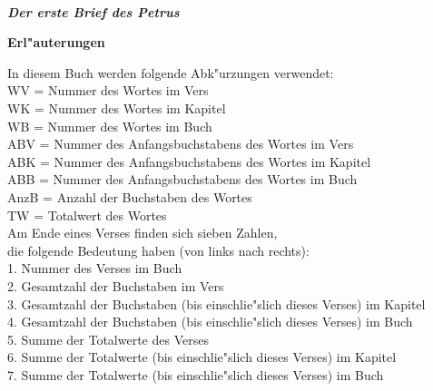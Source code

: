 \documentclass[a4paper,10pt,landscape]{article}
\renewcommand{\sectionmark}[1]{\markright{{#1}}}
\renewcommand{\section}[3]{\begin{center}{ \huge {\bf \textsl{{#1}}\\ \textcolor{red}{\textsl{{#2}}}}}\end{center}
\sectionmark{{#3}}}
\begin{document}

\section{\bigskip\bigskip\bigskip\bigskip\bigskip\bigskip
\\Der erste Brief des Petrus}
{}
{1. Petrus}	%


\bigskip				%

\newpage
\hphantom{x}
\bigskip\bigskip\bigskip\bigskip\bigskip\bigskip
\begin{center}{ \huge {\bf Erl"auterungen}}\end{center}

\medskip
In diesem Buch werden folgende Abk"urzungen verwendet:\\
WV = Nummer des Wortes im Vers\\
WK = Nummer des Wortes im Kapitel\\
WB = Nummer des Wortes im Buch\\
ABV = Nummer des Anfangsbuchstabens des Wortes im Vers\\
ABK = Nummer des Anfangsbuchstabens des Wortes im Kapitel\\
ABB = Nummer des Anfangsbuchstabens des Wortes im Buch\\
AnzB = Anzahl der Buchstaben des Wortes\\
TW = Totalwert des Wortes\\

\medskip
Am Ende eines Verses finden sich sieben Zahlen,\\
die folgende Bedeutung haben (von links nach rechts):\\
1. Nummer des Verses im Buch\\
2. Gesamtzahl der Buchstaben im Vers\\
3. Gesamtzahl der Buchstaben (bis einschlie"slich dieses Verses) im Kapitel\\
4. Gesamtzahl der Buchstaben (bis einschlie"slich dieses Verses) im Buch\\
5. Summe der Totalwerte des Verses\\
6. Summe der Totalwerte (bis einschlie"slich dieses Verses) im Kapitel\\
7. Summe der Totalwerte (bis einschlie"slich dieses Verses) im Buch\\
\end{document}
